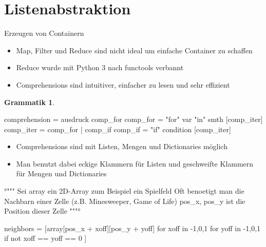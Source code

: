 \documentclass[ngerman]{beamer}
\theoremstyle{definition}
\newtheorem{grammatik}{Grammatik}
\begin{document}
\section{Listenabstraktion}

\begin{frame}{Erzeugen von Containern}
\begin{itemize}
	\item {Map, Filter und Reduce sind nicht ideal um einfache Container zu schaffen}
	\item {Reduce wurde mit Python 3 nach functools verbannt}
	\item {Comprehensions sind intuitiver, einfacher zu lesen und sehr effizient}
\end{itemize}
\begin{grammatik}
	\begin{python}[numbers=none]
		comprehension  = ausdruck comp_for
		comp_for 	   = "for" var "in" smth [comp_iter]
		comp_iter	   = comp_for | comp_if
		comp_if		   = "if" condition [comp_iter]
	\end{python}
\end{grammatik}
\framebreak[2]
\begin{itemize}
	\item {Comprehensions sind mit Listen, Mengen und Dictionaries möglich}
	\item {Man benutzt dabei eckige Klammern für Listen und geschweifte Klammern für Mengen und Dictionaries}
\end{itemize}
\begin{example}
\end{example}
\framebreak
\begin{example}
	\begin{python}
°"""
Sei array ein 2D-Array zum Beispiel ein Spielfeld
Oft benoetigt man die Nachbarn einer Zelle 
(z.B. Minesweeper, Game of Life)
pos_x, pos_y ist die Position dieser Zelle
"""°

neighbors = [array[pos_x + xoff][pos_y + yoff] 
			 	for xoff in {-1,0,1}
				for yoff in {-1,0,1}
				if not xoff == yoff == 0
			]
	\end{python}
\end{example}
\end{frame}
\end{document}
